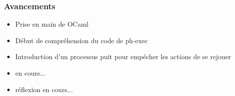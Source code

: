 
\begin{frame}[c]
  \frametitle{Avancements}
 
 
\pause
\begin{itemize}
  \item Prise en main de OCaml
  \item Début de compréhension du code de ph-exec
  \item Introduction d'un processus puit pour empécher les actions de se rejouer
\end{itemize}

\begin{itemize}
 \item en cours...
\end{itemize}

\begin{itemize}
 \item réflexion en cours...
\end{itemize}



\end{frame}

